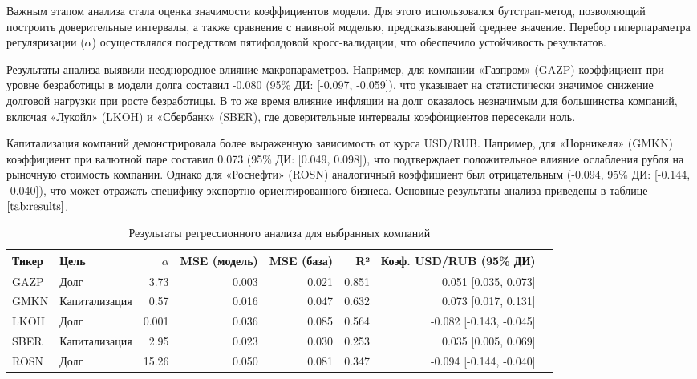 \documentclass[]{article}
\begin{document}
	Важным этапом анализа стала оценка значимости коэффициентов модели. Для этого использовался бутстрап-метод, позволяющий построить доверительные интервалы, а также сравнение с наивной моделью, предсказывающей среднее значение. Перебор гиперпараметра регуляризации ($\alpha$) осуществлялся посредством пятифолдовой кросс-валидации, что обеспечило устойчивость результатов.
	
	Результаты анализа выявили неоднородное влияние макропараметров. Например, для компании «Газпром» (GAZP) коэффициент при уровне безработицы в модели долга составил -0.080 (95\% ДИ: [-0.097, -0.059]), что указывает на статистически значимое снижение долговой нагрузки при росте безработицы. В то же время влияние инфляции на долг оказалось незначимым для большинства компаний, включая «Лукойл» (LKOH) и «Сбербанк» (SBER), где доверительные интервалы коэффициентов пересекали ноль.
	
	Капитализация компаний демонстрировала более выраженную зависимость от курса USD/RUB. Например, для «Норникеля» (GMKN) коэффициент при валютной паре составил 0.073 (95\% ДИ: [0.049, 0.098]), что подтверждает положительное влияние ослабления рубля на рыночную стоимость компании. Однако для «Роснефти» (ROSN) аналогичный коэффициент был отрицательным (-0.094, 95\% ДИ: [-0.144, -0.040]), что может отражать специфику экспортно-ориентированного бизнеса. Основные результаты анализа приведены в таблице $\ref{tab:results}$.
	
	\begin{table}[ht]
		\centering
		\caption{Результаты регрессионного анализа для выбранных компаний}
		\label{tab:results}
		\begin{tabular}{|l|l|r|r|r|r|r|r|}
			\hline
			Тикер & Цель & $\alpha$ & MSE (модель) & MSE (база) & R² & Коэф. USD/RUB (95\% ДИ) \\ 
			\hline
			GAZP & Долг & 3.73 & 0.003 & 0.021 & 0.851 & 0.051 [0.035, 0.073] \\  
			GMKN & Капитализация & 0.57 & 0.016 & 0.047 & 0.632 & 0.073 [0.017, 0.131] \\  
			LKOH & Долг & 0.001 & 0.036 & 0.085 & 0.564 & -0.082 [-0.143, -0.045] \\  
			SBER & Капитализация & 2.95 & 0.023 & 0.030 & 0.253 & 0.035 [0.005, 0.069] \\  
			ROSN & Долг & 15.26 & 0.050 & 0.081 & 0.347 & -0.094 [-0.144, -0.040] \\  
			\hline
		\end{tabular}
	\end{table}
	
\end{document}
